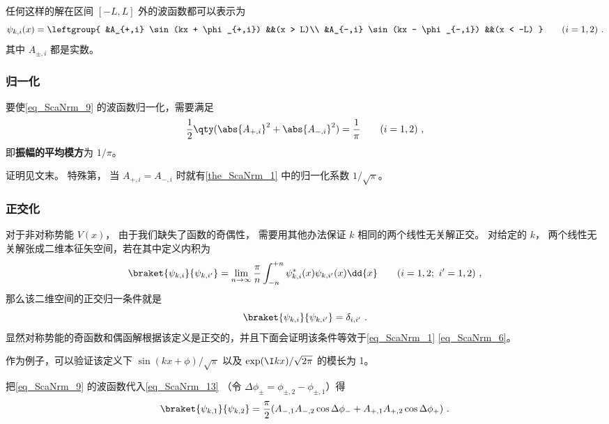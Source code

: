 任何这样的解在区间 $[-L,L]$ 外的波函数都可以表示为
\begin{equation}\label{eq_ScaNrm_9}
\psi_{k,i}(x) = \leftgroup{
    &A_{+,i} \sin(kx + \phi_{+,i}) &&(x > L)\\
    &A_{-,i} \sin(kx - \phi_{-,i}) &&(x < -L)
} \qquad (i = 1,2)~.
\end{equation}
其中 $A_{\pm,i}$ 都是实数。

\subsubsection{归一化}
\begin{theorem}{}\label{the_ScaNrm_2}
要使\autoref{eq_ScaNrm_9} 的波函数归一化，需要满足
\begin{equation}\label{eq_ScaNrm_4}
\frac{1}{2}\qty(\abs{A_{+,i}}^2 + \abs{A_{-,i}}^2) = \frac{1}{\pi} \qquad (i = 1,2)~,
\end{equation}
即\textbf{振幅的平均模方}为 $1/\pi$。
\end{theorem}
证明见文末。 特殊第， 当 $A_{+,i} = A_{-,i}$ 时就有\autoref{the_ScaNrm_1} 中的归一化系数 $1/\sqrt{\pi}$。

\subsubsection{正交化}
对于非对称势能 $V(x)$， 由于我们缺失了函数的奇偶性， 需要用其他办法保证 $k$ 相同的两个线性无关解正交。 对给定的 $k$， 两个线性无关解张成二维本征矢空间，若在其中定义内积为
\begin{equation}\label{eq_ScaNrm_13}
\braket{\psi_{k,i}}{\psi_{k,i'}} = \lim_{n\to\infty}\frac{\pi}{n}\int_{-n}^{+n} \psi_{k,i}^*(x) \psi_{k,i'}(x) \dd{x} \qquad (i = 1,2;\ i' = 1,2)~,
\end{equation}
那么该二维空间的正交归一条件就是
\begin{equation}\label{eq_ScaNrm_7}
\braket{\psi_{k,i}}{\psi_{k,i'}} = \delta_{i,i'}~.
\end{equation}
显然对称势能的奇函数和偶函解根据该定义是正交的，并且下面会证明该条件等效于\autoref{eq_ScaNrm_1} \autoref{eq_ScaNrm_6}。


作为例子，可以验证该定义下 $\sin(kx+\phi)/\sqrt{\pi}$ 以及 $\exp(\I kx)/\sqrt{2\pi}$ 的模长为 1。 

把\autoref{eq_ScaNrm_9} 的波函数代入\autoref{eq_ScaNrm_13} （令 $\Delta\phi_\pm = \phi_{\pm, 2} - \phi_{\pm, 1}$）得
\begin{equation}
\braket{\psi_{k,1}}{\psi_{k,2}} = \frac{\pi}{2}(A_{-,1}A_{-,2}\cos\Delta\phi_- + A_{+,1}A_{+,2}\cos\Delta\phi_+)~.
\end{equation}


